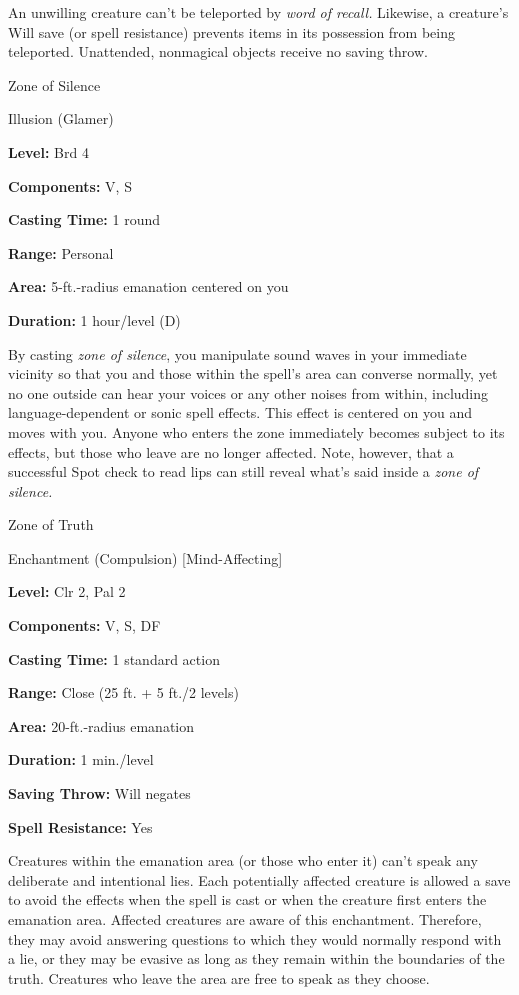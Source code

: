 \documentclass{article}
\begin{document}
An unwilling creature can't be teleported by \textit{word of recall. }Likewise, 
a creature's Will save (or spell resistance) prevents items in its possession from 
being teleported. Unattended, nonmagical objects receive no saving throw.

\vspace{12pt}
Zone of Silence

Illusion (Glamer)

\textbf{Level:} Brd 4

\textbf{Components:} V, S

\textbf{Casting Time:} 1 round

\textbf{Range:} Personal

\textbf{Area:} 5-ft.-radius emanation centered on you

\textbf{Duration:} 1 hour/level (D)

By casting \textit{zone of silence}, you manipulate sound waves in your immediate 
vicinity so that you and those within the spell's area can converse normally, yet 
no one outside can hear your voices or any other noises from within, including 
language-dependent or sonic spell effects. This effect is centered on you and moves 
with you. Anyone who enters the zone immediately becomes subject to its effects, 
but those who leave are no longer affected. Note, however, that a successful Spot 
check to read lips can still reveal what's said inside a \textit{zone of silence.}

\vspace{12pt}
Zone of Truth

Enchantment (Compulsion) [Mind-Affecting]

\textbf{Level:} Clr 2, Pal 2

\textbf{Components:} V, S, DF

\textbf{Casting Time:} 1 standard action

\textbf{Range:} Close (25 ft. + 5 ft./2 levels)

\textbf{Area:} 20-ft.-radius emanation

\textbf{Duration:} 1 min./level

\textbf{Saving Throw: }Will negates

\textbf{Spell Resistance:} Yes

Creatures within the emanation area (or those who enter it) can't speak any deliberate 
and intentional lies. Each potentially affected creature is allowed a save to avoid 
the effects when the spell is cast or when the creature first enters the emanation 
area. Affected creatures are aware of this enchantment. Therefore, they may avoid 
answering questions to which they would normally respond with a lie, or they may 
be evasive as long as they remain within the boundaries of the truth. Creatures 
who leave the area are free to speak as they choose.

\newpage
\end{document}
